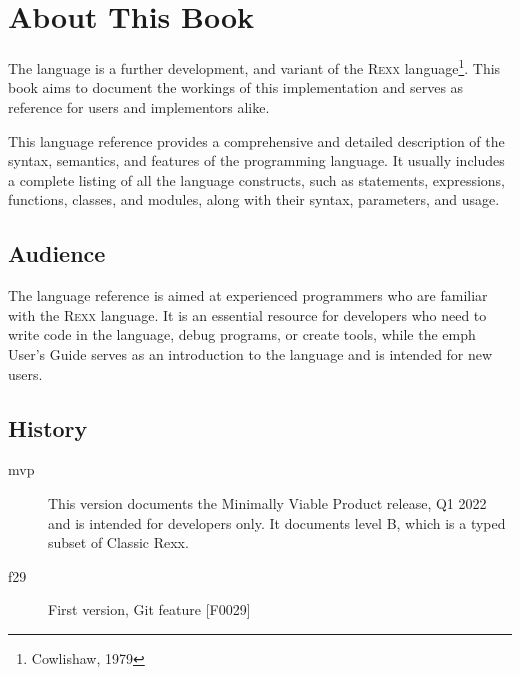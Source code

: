 \def\tightlist{}


\chapter*{About This Book}
The \crexx{} language is a further development, and variant of the
\textsc{Rexx} language\footnote{Cowlishaw, 1979}. This book aims to
document the workings of this implementation and serves as reference
for users and implementors alike.

This language reference provides a comprehensive and detailed
description of the syntax, semantics, and features of the \crexx{}
programming language. It usually includes a complete listing of all
the language constructs, such as statements, expressions, functions,
classes, and modules, along with their syntax, parameters, and usage.

\section*{Audience}
The \crexx[] language reference is aimed at experienced programmers who
are familiar with the \textsc{Rexx} language. It is an
essential resource for developers who need to write code in the
language, debug programs, or create tools, while the emph{\crexx{} User's Guide} serves as an introduction to
the language and is intended for new users.

\section*{History}

\begin{description}
\item[mvp] This version documents the Minimally Viable Product
  release, Q1 2022 and is intended for developers only. It documents \crexx{} level B, which is a typed
  subset of Classic Rexx.
\item[f29] First version, Git feature [F0029]
\end{description}

